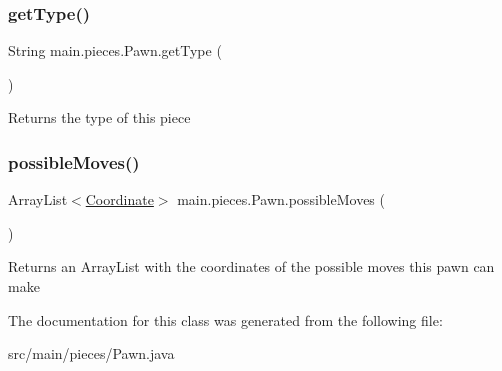 \subsubsection{\texorpdfstring{get\+Type()}{getType()}}
{\footnotesize\ttfamily String main.\+pieces.\+Pawn.\+get\+Type (\begin{DoxyParamCaption}{ }\end{DoxyParamCaption})}

Returns the type of this piece \hypertarget{classmain_1_1pieces_1_1_pawn_a06262375d095ccab099b861dc81bf5f1}{}\label{classmain_1_1pieces_1_1_pawn_a06262375d095ccab099b861dc81bf5f1} 
\subsubsection{\texorpdfstring{possible\+Moves()}{possibleMoves()}}
{\footnotesize\ttfamily Array\+List$<$\hyperlink{classmain_1_1model_1_1_coordinate}{Coordinate}$>$ main.\+pieces.\+Pawn.\+possible\+Moves (\begin{DoxyParamCaption}{ }\end{DoxyParamCaption})}

Returns an Array\+List with the coordinates of the possible moves this pawn can make 

The documentation for this class was generated from the following file\+:\begin{DoxyCompactItemize}
\item 
src/main/pieces/Pawn.\+java\end{DoxyCompactItemize}
